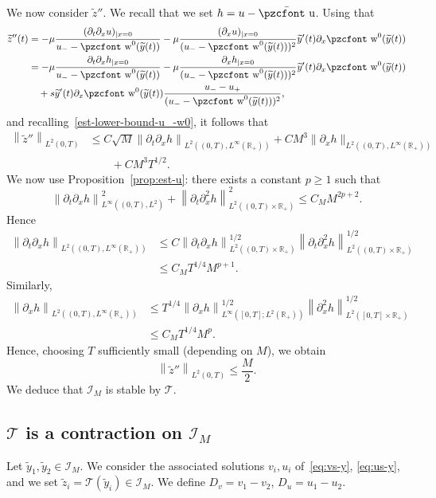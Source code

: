 \documentclass[10pt]{amsart}
\theoremstyle{definition}\newtheorem{defi}[theo]{Definition}\newtheorem{rema}[theo]{Remark}\newtheorem{exam}[theo]{Example}\newtheorem{exem}[theo]{Example}\newtheorem{nota}[theo]{Notation}
\newcommand{\mathpzc}[1]{\text{\pzcfont #1}}
\newcommand{\R}{\mathbb{R}}
\newcommand{\p}{\partial}
\newcommand{\bu}{\bar{\mathpzc{u}}}
\newcommand{\cT}{\mathcal T}
\newcommand{\cI}{\mathcal I}
\newcommand{\tw}{\mathpzc{w}}
\newcommand{\ty}{\widetilde{y}}
\newcommand{\tz}{\widetilde{z}}
\newcommand{\dv}{D_v}
\newcommand{\du}{D_u}
\begin{document}
We now consider $\tz''$. We recall that we set $h=u-\bu$. Using that
\begin{align}\label{eq:z''}
\tz''(t) & = - \mu \frac{(\p_t \p_x u)_{|x=0}}{u_--\tw^0(\ty(t))} - \mu \frac{(\p_x u)_{|x=0}}{(u_--\tw^0(\ty(t)))^2}\ty'(t) \p_x \tw^0(\ty(t)) \nonumber \\
& = - \mu \frac{\p_t\p_xh_{|x=0}}{u_--\tw^0(\ty(t))} - \mu \frac{\p_xh_{|x=0}}{(u_--\tw^0(\ty(t)))^2}\ty'(t)\p_x \tw^0(\ty(t))\\
&\quad + s \ty'(t) \p_x \tw^0(\ty(t)) \frac{u_--u_+}{(u_--\tw^0(\ty(t)))^2},
\end{align}
and recalling~\eqref{est-lower-bound-u_-w0}, it follows that
\begin{align*}
\left\|\tz''\right\|_{L^2(0,T)} & \leq C \sqrt{M} \left\|\p_t \p_x h\right\|_{L^2((0,T), L^\infty(\R_+))} + C M^3 \| \p_x h\|_{L^2((0,T), L^\infty(\R_+))} \\
& \qquad + C M^{3} T^{1/2}.
\end{align*}
We now use Proposition~\ref{prop:est-u}: there exists a constant $p\geq 1$ such that
\[
\left\|\p_t \p_xh\right\|_{L^\infty\left((0,T), L^2\right)}^2 + \left\|\p_t\p_x^2 h\right\|_{L^2\left((0,T)\times \R_+\right)}^2 \leq C_M M^{2p+2}.
\]
Hence
\begin{align*}
\left\|\p_t \p_x h\right\|_{L^2\left((0,T), L^\infty(\R_+)\right)} & \leq C\left\|\p_t \p_x h\right\|_{L^2\left((0,T) \times \R_+\right)}^{1/2} \left\|\p_t \p^2_x h\right\|_{L^2\left((0,T) \times \R_+\right)}^{1/2} \\
& \leq C_M T^{1/4} M^{p+1}.
\end{align*}
Similarly,
\begin{align*}
\left\| \p_x h\right\|_{L^2\left((0,T), L^\infty(\R_+)\right)} & \leq T^{1/4} \left\|\p_xh\right\|_{L^\infty\left([0,T];L^2(\R_+)\right)}^{1/2} \left\|\p_x^2h\right\|_{L^2\left([0,T]\times \R_+\right)}^{1/2} \\
& \leq C_M T^{1/4} M^p.
\end{align*}
Hence, choosing $T$ sufficiently small (depending on $M$), we obtain
\[
\left\|\tz''\right\|_{L^2(0,T)}\leq \frac{M}{2}.
\]
We deduce that $\cI_M$ is stable by $\cT$.


\subsection{\texorpdfstring{$\cT$}{T} is a contraction on \texorpdfstring{$\cI_M$}{IM}}
Let $\ty_1, \ty_2\in \cI_M$. We consider the associated solutions $v_{i}, u_{i}$ of~\eqref{eq:vs-y}, \eqref{eq:us-y}, and we set $\tz_i=\cT(\ty_i)\in \cI_M$. We define $\dv=v_1-v_2$, $\du=u_1-u_2$.
\end{document}
